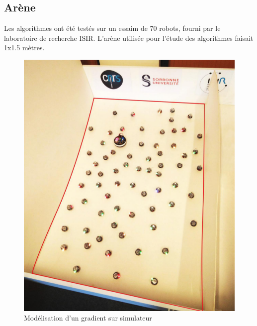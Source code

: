 \documentclass[a4paper]{article}
\begin{document}
\subsection{Arène}
Les algorithmes ont été testés sur un essaim de 70 robots, fourni par le laboratoire de recherche ISIR. L'arène utilisée pour l'étude des algorithmes faisait 1x1.5 mètres.\\
\begin{figure}[h]
	\begin{center}
		\centering
		\includegraphics[scale=0.4,angle=-90]{../../script_results/arene.png}
		\caption{Modélisation  d'un gradient sur simulateur}
	\end{center}
\end{figure} \\
\end{document}
